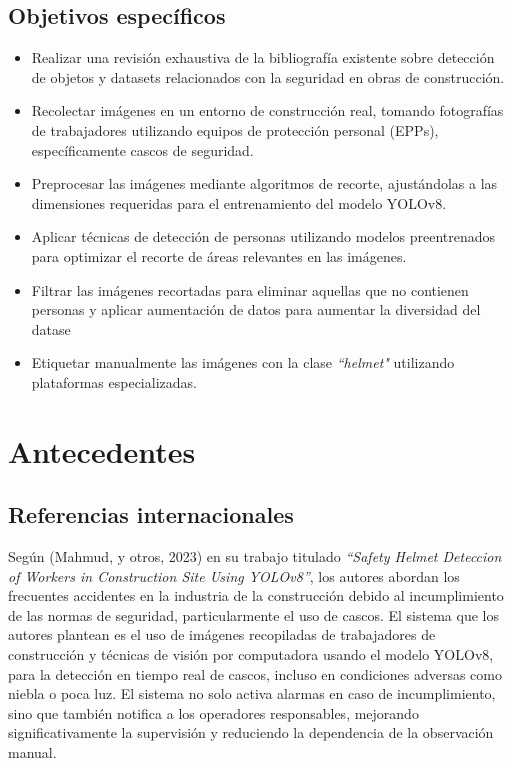 \subsection{Objetivos específicos}

\begin{itemize}
  \item Realizar una revisión exhaustiva de la bibliografía existente sobre detección de objetos y datasets relacionados con la seguridad en obras de construcción.
  \item Recolectar imágenes en un entorno de construcción real, tomando fotografías de trabajadores utilizando equipos de protección personal (EPPs), específicamente cascos de seguridad.
  \item Preprocesar las imágenes mediante algoritmos de recorte, ajustándolas a las dimensiones requeridas para el entrenamiento del modelo YOLOv8.
  \item Aplicar técnicas de detección de personas utilizando modelos preentrenados para optimizar el recorte de áreas relevantes en las imágenes.
  \item Filtrar las imágenes recortadas para eliminar aquellas que no contienen personas y aplicar aumentación de datos para aumentar la diversidad del datase
  \item Etiquetar manualmente las imágenes con la clase \textit{``helmet"} utilizando plataformas especializadas.
\end{itemize}

\section{Antecedentes}

\subsection{Referencias internacionales}

Según (Mahmud, y otros, 2023) \cite{mahmud2023safety} en su trabajo titulado \textit{``Safety Helmet Deteccion of
Workers in Construction Site Using YOLOv8''}, los autores abordan los frecuentes accidentes en la industria de la construcción debido al incumplimiento de las normas de seguridad, particularmente el uso de cascos. El sistema que los autores plantean es el uso de imágenes recopiladas de trabajadores de construcción y técnicas de visión por computadora usando el modelo YOLOv8, para la detección en tiempo real de cascos, incluso en condiciones adversas como niebla o poca luz. El sistema no solo activa alarmas en caso de incumplimiento, sino que también notifica a los operadores responsables, mejorando significativamente la supervisión y reduciendo la dependencia de la observación
manual.


